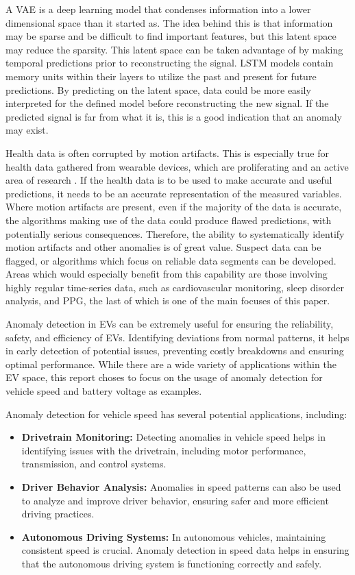 \documentclass[conference]{IEEEtran}
\begin{document}
A VAE is a deep learning model that condenses information into a lower dimensional space than it started as. The idea behind this is that information may be sparse and be difficult to find important features, but this latent space may reduce the sparsity. This latent space can be taken advantage of by making temporal predictions prior to reconstructing the signal. LSTM models contain memory units within their layers to utilize the past and present for future predictions. By predicting on the latent space, data could be more easily interpreted for the defined model before reconstructing the new signal. If the predicted signal is far from what it is, this is a good indication that an anomaly may exist.

Health data is often corrupted by motion artifacts. This is especially true for health data gathered from wearable devices, which are proliferating and an active area of research \cite{conor_ref}. If the health data is to be used to make accurate and useful predictions, it needs to be an accurate representation of the measured variables. Where motion artifacts are present, even if the majority of the data is accurate, the algorithms making use of the data could produce flawed predictions, with potentially serious consequences. Therefore, the ability to systematically identify motion artifacts and other anomalies is of great value. Suspect data can be flagged, or algorithms which focus on reliable data segments can be developed. Areas which would especially benefit from this capability are those involving highly regular time-series data, such as cardiovascular monitoring, sleep disorder analysis, and PPG, the last of which is one of the main focuses of this paper.

Anomaly detection in EVs can be extremely useful for ensuring the reliability, safety, and efficiency of EVs. Identifying deviations from normal patterns, it helps in early detection of potential issues, preventing costly breakdowns and ensuring optimal performance. While there are a wide variety of applications within the EV space, this report choses to focus on the usage of anomaly detection for vehicle speed and battery voltage as examples.

Anomaly detection for vehicle speed has several potential applications, including:

\begin{itemize}
    \item \textbf{Drivetrain Monitoring:} Detecting anomalies in vehicle speed helps in identifying issues with the drivetrain, including motor performance, transmission, and control systems.
    \item \textbf{Driver Behavior Analysis:} Anomalies in speed patterns can also be used to analyze and improve driver behavior, ensuring safer and more efficient driving practices.
    \item \textbf{Autonomous Driving Systems:} In autonomous vehicles, maintaining consistent speed is crucial. Anomaly detection in speed data helps in ensuring that the autonomous driving system is functioning correctly and safely.
\end{itemize}
\end{document}
